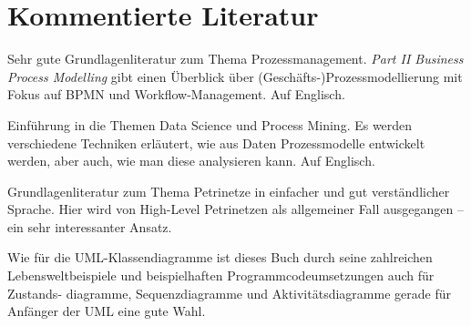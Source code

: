 \section{Kommentierte Literatur}

{Sehr gute Grundlagenliteratur zum Thema Prozessmanagement. \textit{Part II Business Process Modelling} gibt einen Überblick über (Geschäfts-)Prozessmodellierung mit Fokus auf BPMN und Workflow-Management. Auf Englisch.}

{Einführung in die Themen Data Science und Process Mining. Es werden verschiedene Techniken erläutert, wie aus Daten Prozessmodelle entwickelt werden, aber auch, wie man diese analysieren kann. Auf Englisch.}

{Grundlagenliteratur zum Thema Petrinetze in einfacher und gut verständlicher Sprache. Hier wird von High-Level Petrinetzen als allgemeiner Fall ausgegangen -- ein sehr interessanter Ansatz.}

{Wie für die UML-Klassendiagramme ist dieses Buch durch seine zahlreichen Lebens\-welt\-beispiele und beispielhaften Programmcodeumsetzungen auch für Zustands-
	\linebreak %
	diagramme, Sequenzdiagramme und Aktivitätsdiagramme gerade für Anfänger der UML eine gute Wahl.}
